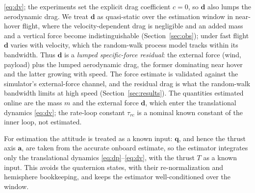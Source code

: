 \documentclass{ieeeaccess}
\newcommand{\vect}[1]{\bm{#1}}
\begin{document}
\eqref{eq:dv}; the experiments set the explicit drag coefficient $c=0$, so $\vect{d}$
also lumps the aerodynamic drag. We treat $\vect{d}$ as quasi-static over the
estimation window in near-hover flight, where the velocity-dependent drag is
negligible and an added mass and a vertical force become indistinguishable
(Section~\ref{sec:obs}); under fast flight $\vect{d}$ varies with velocity, which
the random-walk process model tracks within its bandwidth. Thus $\vect{d}$ is a
\emph{lumped specific-force residual}: the external force (wind, payload) plus the
lumped aerodynamic drag, the former dominating near hover and the latter growing
with speed. The force estimate is validated against the simulator's external-force
channel, and the residual drag is what the random-walk bandwidth limits at high
speed (Section~\ref{sec:results}). The quantities
estimated online are the mass $m$ and the external force $\vect{d}$, which enter
the translational dynamics \eqref{eq:dv}; the rate-loop constant $\tau_{rc}$ is a
nominal known constant of the inner loop, not estimated.

For estimation the attitude is treated as a known input: $\vect{q}$, and hence
the thrust axis $\vect{a}$, are taken from the accurate onboard estimate, so the
estimator integrates only the translational dynamics
\eqref{eq:dp}--\eqref{eq:dv}, with the thrust $T$ as a known input. This avoids the
quaternion states, with their re-normalization and hemisphere bookkeeping, and
keeps the estimator well-conditioned over the window.
\end{document}

